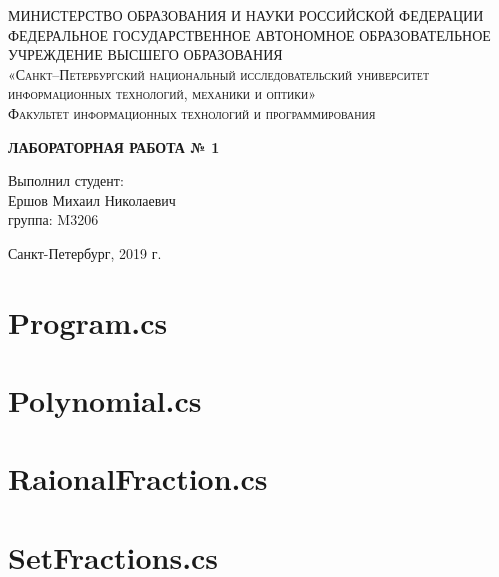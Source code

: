 \documentclass{article}
\begin{document}
        \begin{titlepage}
        \begin{center}
        \textsc{МИНИСТЕРСТВО ОБРАЗОВАНИЯ И НАУКИ РОССИЙСКОЙ ФЕДЕРАЦИИ ФЕДЕРАЛЬНОЕ ГОСУДАРСТВЕННОЕ АВТОНОМНОЕ ОБРАЗОВАТЕЛЬНОЕ УЧРЕЖДЕНИЕ ВЫСШЕГО ОБРАЗОВАНИЯ\\[5mm]
        «Санкт–Петербургский национальный исследовательский университет информационных технологий, механики и оптики»\\[20mm]
        Факультет информационных технологий и программирования\\[5mm]
        }
        \vfill
        
        \textbf{ЛАБОРАТОРНАЯ РАБОТА № 1 \\[20mm]}
        \end{center}
        
        \hfill
        \begin{minipage}{.3\textwidth}
        Выполнил студент:\\[2mm] 
        Ершов Михаил Николаевич \\
        группа: M3206\\[5mm]
        \end{minipage}%
        \vfill
        \begin{center}
        Санкт-Петербург, 2019 г.
        \end{center}
        \end{titlepage}
 
\section{Program.cs}
 
\newpage
\section{Polynomial.cs}
 
\newpage
\section{RaionalFraction.cs}
 
\newpage
\section{SetFractions.cs}
 

\newpage
\end{document}

